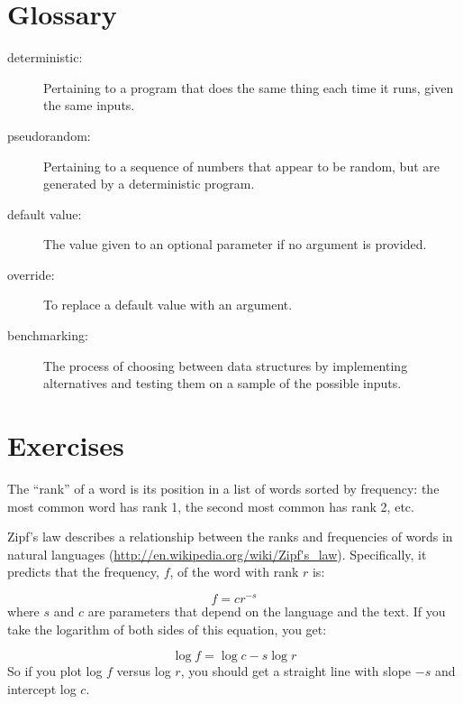 \documentclass[10pt]{book}
\begin{document}
\begin{CJK}{UTF8}{gbsn}
\section{Glossary}

\begin{description}

\item[deterministic:] Pertaining to a program that does the same
thing each time it runs, given the same inputs.

\item[pseudorandom:] Pertaining to a sequence of numbers that appear
to be random, but are generated by a deterministic program.

\item[default value:] The value given to an optional parameter if no
argument is provided.

\item[override:] To replace a default value with an argument.

\item[benchmarking:] The process of choosing between data structures
by implementing alternatives and testing them on a sample of the
possible inputs.  

\end{description}


\section{Exercises}

\begin{exercise}

The ``rank'' of a word is its position in a list of words
sorted by frequency: the most common word has rank 1, the
second most common has rank 2, etc.

Zipf's law describes a relationship between the ranks and frequencies
of words in natural languages
(\url{http://en.wikipedia.org/wiki/Zipf's_law}).  Specifically, it
predicts that the frequency, $f$, of the word with rank $r$ is:

\[ f = c r^{-s} \]
%
where $s$ and $c$ are parameters that depend on the language and the
text.  If you take the logarithm of both sides of this equation, you
get:

\[ \log f = \log c - s \log r \]
%
So if you plot log $f$ versus log $r$, you should get
a straight line with slope $-s$ and intercept log $c$.


\end{exercise}
\end{CJK}
\end{document}
